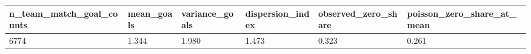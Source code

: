 \begin{tabular}{llllll}
\toprule
n\_team\_match\_goal\_counts & mean\_goals & variance\_goals & dispersion\_index & observed\_zero\_share & poisson\_zero\_share\_at\_mean \\
\midrule
6774 & 1.344 & 1.980 & 1.473 & 0.323 & 0.261 \\
\bottomrule
\end{tabular}
